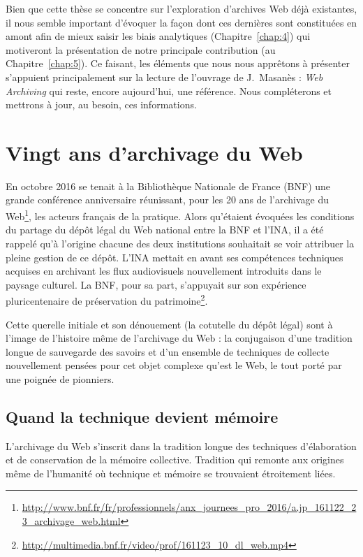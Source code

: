 \documentclass[symmetric,justified,marginals=raggedouter]{tufte-book}
\begin{document}
Bien que cette thèse se concentre sur l'exploration d'archives Web déjà existantes, il nous semble important d'évoquer la façon dont ces dernières sont constituées en amont afin de mieux saisir les biais analytiques (Chapitre~\ref{chap:4}) qui motiveront la présentation de notre principale contribution (au Chapitre~\ref{chap:5}). Ce faisant, les éléments que nous nous apprêtons à présenter s'appuient principalement sur la lecture de l'ouvrage de J.~Masanès : \textit{Web Archiving} \citep{masanes_web_2006} qui reste, encore aujourd'hui, une référence. Nous compléterons et mettrons à jour, au besoin, ces informations.\\

\section{Vingt ans d'archivage du Web}
\label{sec:3_20ans}

\noindent En octobre 2016 se tenait à la Bibliothèque Nationale de France (BNF) une grande conférence anniversaire réunissant, pour les 20 ans de l'archivage du Web\footnote{\RaggedOuter \url{http://www.bnf.fr/fr/professionnels/anx_journees_pro_2016/a.jp_161122_23_archivage_web.html}}, les acteurs français de la pratique. Alors qu'étaient évoquées les conditions du partage du dépôt légal du Web national entre la BNF et l'INA, il a été rappelé qu'à l'origine chacune des deux institutions souhaitait se voir attribuer la pleine gestion de ce dépôt. L'INA mettait en avant ses compétences techniques acquises en archivant les flux audiovisuels nouvellement introduits dans le paysage culturel. La BNF, pour sa part, s'appuyait sur son expérience pluricentenaire de préservation du patrimoine\footnote{\RaggedOuter \url{http://multimedia.bnf.fr/video/prof/161123_10_dl_web.mp4}}. 

Cette querelle initiale et son dénouement (la cotutelle du dépôt légal) sont à l'image de l'histoire même de l'archivage du Web : la conjugaison d'une tradition longue de sauvegarde des savoirs et d'un ensemble de techniques de collecte nouvellement pensées pour cet objet complexe qu'est le Web, le tout porté par une poignée de pionniers.

\subsection{Quand la technique devient mémoire}

\noindent L'archivage du Web s'inscrit dans la tradition longue des techniques d'élaboration et de conservation de la mémoire collective. Tradition qui remonte aux origines même de l'humanité où technique et mémoire se trouvaient étroitement liées. 
\end{document}
